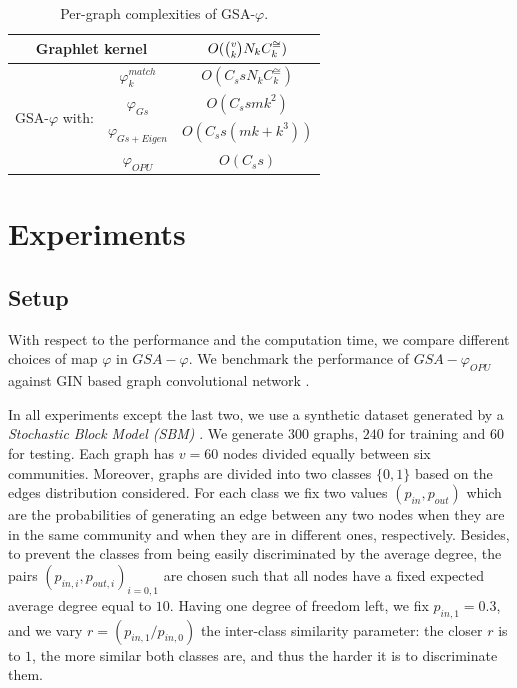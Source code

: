 \documentclass{article}
\begin{document}
\begin{table}
\centering
\begin{tabular}{|c|c|c|}
\hline
\multicolumn{2}{|c|}{Graphlet kernel} & $O(\tbinom{v}{k} N_k C^{\cong}_k)$\\ \hline \hline
%
\multirow{4}{*}{GSA-$\varphi$ with:} & $\varphi^{match}_k$ & $O(C_s s N_k C^{\cong}_k)$ \\
& $\varphi_{Gs}$ & $O(C_s s m k^2)$ \\ 
& $\varphi_{Gs+Eigen}$  & $O(C_s s (m k + k^3))$ \\ 
& $\varphi_{OPU}$  & $O(C_s s)$ \\ \hline
\end{tabular}
\caption{Per-graph complexities of GSA-$\varphi$.}
\label{tab:cost}
\end{table}


\section{Experiments}\label{sec:experiments}
\subsection{Setup}\label{sec:setup}
With respect to the performance and  the computation time, we compare different choices of  map $\varphi$ in $GSA-\varphi$. We benchmark the performance of $GSA-\varphi_{OPU}$ against GIN based graph convolutional network \cite{GCN_powerful}.

In all experiments except the last two, we use a synthetic dataset generated by a \emph{Stochastic Block Model (SBM)} \cite{SBM}. We generate $300$ graphs, $240$ for training  and $60$ for testing. Each graph has $v=60$ nodes divided equally between six communities. Moreover, graphs are divided into two classes $\{0 , 1\}$ based on the edges distribution considered. For each class we fix two values $(p_{in} , p_{out})$ which are  the probabilities of generating an edge between any two nodes when they are in the same community and when they are in different ones, respectively. Besides, to prevent the classes from being easily discriminated by the average degree, the pairs $(p_{in,i} , p_{out,i})_{i=0,1}$ are chosen such that all nodes have a fixed expected average degree equal to $10$. Having one degree of freedom left, we fix $p_{in,1}=0.3$, and we vary $r=(p_{in,1}/p_{in,0})$ the inter-class similarity parameter: the closer $r$ is to $1$, the more similar both classes are, and thus the harder it is to discriminate them.
\end{document}
